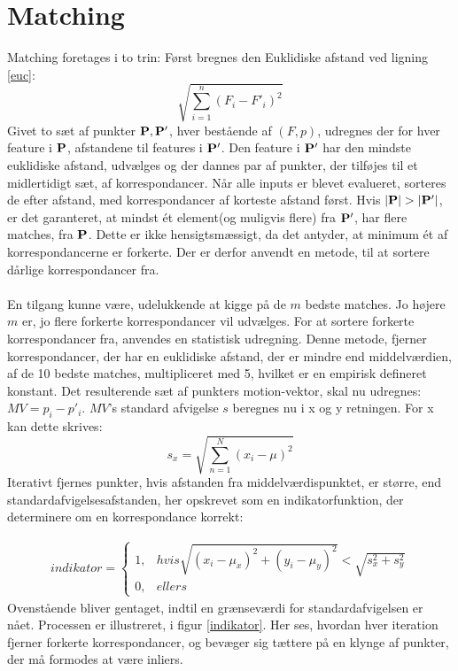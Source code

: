 \section{Matching}
\label{sec:match}
Matching foretages i to trin: Først bregnes den Euklidiske afstand ved ligning \eqref{euc}:
\begin{equation}
\sqrt{\sum\limits_{i=1}^n(F_i-F'_i)^2}
\label{euc}
\end{equation}
Givet to sæt af punkter $\bold{P}, \bold{P}'$, hver bestående af $(F, p)$, udregnes der for hver feature i $\bold{P}$, afstandene til features i $\bold{P}'$. Den feature i $\bold{P}'$ har den mindste euklidiske afstand, udvælges og der dannes par af punkter, der tilføjes til et midlertidigt sæt, af korrespondancer. Når alle inputs er blevet evalueret, sorteres de efter afstand, med korrespondancer af korteste afstand først. Hvis $|\bold{P}| > |\bold{P}'|$, er det garanteret, at mindst ét element(og muligvis flere) fra $\bold{P}'$, har flere matches, fra $\bold{P}$. Dette er ikke hensigtsmæssigt, da det antyder, at minimum ét af korrespondancerne er forkerte. Der er derfor anvendt en metode, til at sortere dårlige korrespondancer fra.
\\
\\
En tilgang kunne være, udelukkende at kigge på de $m$ bedste matches. Jo højere $m$ er, jo flere forkerte korrespondancer vil udvælges. For at sortere forkerte korrespondancer fra, anvendes en statistisk udregning. Denne metode, fjerner korrespondancer, der har en euklidiske afstand, der er mindre end middelværdien, af de 10 bedste matches, multipliceret med 5, hvilket er en empirisk defineret konstant. Det resulterende sæt af punkters motion-vektor, skal nu udregnes: $MV = p_i - p'_i$. 
$MV$'s standard afvigelse $s$ beregnes nu i x og y retningen. For x kan dette skrives: 
\begin{equation}
s_x = \sqrt{ \sum \limits_{n=1}^N (x_i  - \mu)^2 }
\label{pis}
\end{equation}
Iterativt fjernes punkter, hvis afstanden fra middelværdispunktet, er større, end standardafvigelsesafstanden, her opskrevet som en indikatorfunktion, der determinere om en korrespondance korrekt:

\begin{equation}
\begin{split}
indikator = 
\begin{cases}
1,&hvis \sqrt{(x_i - \mu_x)^2 + (y_i - \mu_y)^2} < \sqrt{s_x^2 + s_y^2} \\
0,& ellers
\end{cases}
\end{split}
\label{indikator}
\end{equation}
Ovenstående bliver gentaget, indtil en grænseværdi for standardafvigelsen er nået. Processen er illustreret, i figur \eqref{indikator}. Her ses, hvordan hver iteration fjerner forkerte korrespondancer, og bevæger sig tættere på en klynge af punkter, der må formodes at være inliers.
